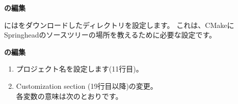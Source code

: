 \bigskip
\noindent
\bf{\CMakeTopdir{}}の編集
\begin{narrow}[20pt]
	\CMakeTopdir{}には\SprLib をダウンロードしたディレクトリを設定します。
	これは、CMakeにSpringheadのソースツリーの場所を教えるために必要な設定です。

	\begin{narrow}[15pt]
	\end{narrow}
\end{narrow}
\medskip
\bf{\CMakeLists{}}の編集
\begin{narrow}[20pt]
	\begin{enumerate}
	    \item
		プロジェクト名を設定します(11行目)。

		\begin{narrow}[s][5pt]
		\end{narrow}

	    \item
		Customization section (19行目以降)の変更。\\
		各変数の意味は次のとおりです。


\end{enumerate}
\end{narrow}
